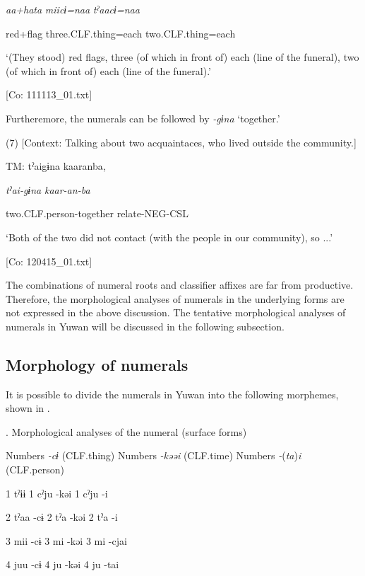    \textit{aa+hata}  \textit{miicɨ=naa}  \textit{tˀaacɨ=naa}

    red+flag  three.CLF.thing=each  two.CLF.thing=each

    ‘(They stood) red flags, three (of which in front of) each (line of the funeral), two (of which in front of) each (line of the funeral).’

    [Co: 111113\_01.txt]

  Furtheremore, the numerals can be followed by \textit{{}-gɨna} ‘together.’

(7)  [Context: Talking about two acquaintaces, who lived outside the community.]

  TM:  tˀaigɨna  kaaranba,

    \textit{tˀai-gɨna}  \textit{kaar-an-ba}

    two.CLF.person-together  relate-NEG-CSL

    ‘Both of the two did not contact (with the people in our community), so ...’

    [Co: 120415\_01.txt]

The combinations of numeral roots and classifier affixes are far from productive. Therefore, the morphological analyses of numerals in the underlying forms are not expressed in the above discussion. The tentative morphological analyses of numerals in Yuwan will be discussed in the following subsection.

\subsection{Morphology of numerals}

It is possible to divide the numerals in Yuwan into the following morphemes, shown in .

\begin{styleBeschriftung}
\textmd{}\textmd{. Morphological analyses of the numeral (surface forms)}
\end{styleBeschriftung}

Numbers  \textit{{}-cɨ} (CLF.thing)    Numbers  \textit{{}-kəəi} (CLF.time)    Numbers  \textit{{}-}(\textit{ta})\textit{i} (CLF.person)

1  tˀɨɨ      1  cˀju  {}-kəi    1  cˀju  {}-i

2  tˀaa  {}-cɨ    2  tˀa  {}-kəi    2  tˀa  {}-i

3  mii  {}-cɨ    3  mi  {}-kəi    3  mi  {}-cjai

4  juu  {}-cɨ    4  ju  {}-kəi    4  ju  {}-tai

